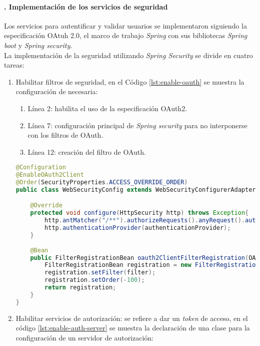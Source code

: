 \paragraph{. Implementación de los servicios de seguridad\\}
Los servicios para autentificar y validar usuarios se implementaron siguiendo la especificación OAtuh 2.0, el marco de trabajo \textit{Spring} con sus bibliotecas \textit{Spring boot} y \textit{Spring security}.\\
La implementación de la seguridad utilizando \textit{Spring Security} se divide en cuatro tareas:
\begin{enumerate}
	\item Habilitar filtros de seguridad, en el Código \ref{lst:enable-oauth} se muestra la configuración de necesaria:
	\begin{enumerate}
		\item Línea 2: habilita el uso de la especificación OAuth2.
		\item Línea 7: configuración principal de \textit{Spring security} para no interponerse con los filtros de OAuth.
		\item Línea 12: creación del filtro de OAuth.
	\end{enumerate}
\begin{lstlisting}[language=Java, caption={Clase para habilitar los filtros de seguridad.}, captionpos=b, label={lst:enable-oauth}]
@Configuration
@EnableOAuth2Client
@Order(SecurityProperties.ACCESS_OVERRIDE_ORDER)
public class WebSecurityConfig extends WebSecurityConfigurerAdapter{

	@Override
	protected void configure(HttpSecurity http) throws Exception{
		http.antMatcher("/**").authorizeRequests().anyRequest().authenticated().and().logout().logoutSuccessUrl("/").permitAll().and().sessionManagement().sessionCreationPolicy(SessionCreationPolicy.STATELESS).and().csrf().disable();
		http.authenticationProvider(authenticationProvider);
	}
	
	@Bean
	public FilterRegistrationBean oauth2ClientFilterRegistration(OAuth2ClientContextFilter filter){
		FilterRegistrationBean registration = new FilterRegistrationBean();
		registration.setFilter(filter);
		registration.setOrder(-100);
		return registration;
	}
}	
\end{lstlisting}

	\item Habilitar servicios de autorización: se refiere a dar un \textit{token} de acceso, en el código \ref{lst:enable-auth-server} se muestra la declaración de una clase para la configuración de un servidor de autorización:


\end{enumerate}
